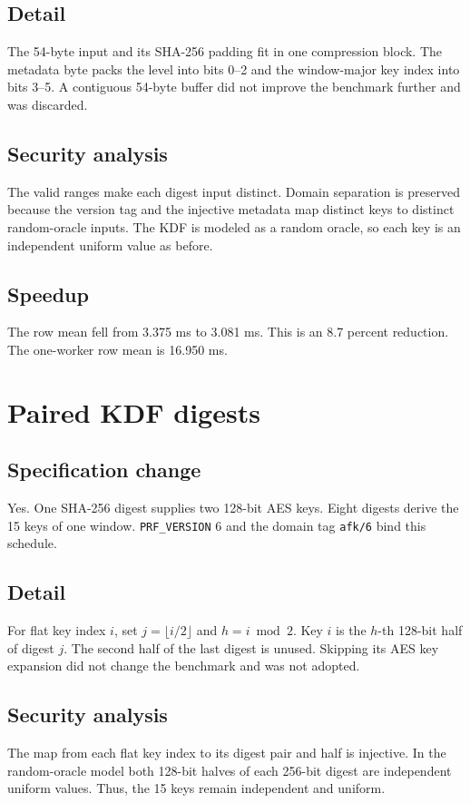 \documentclass[10pt]{article}
\begin{document}
\subsection{Detail}
The 54-byte input and its SHA-256 padding fit in one compression block.
The metadata byte packs the level into bits 0--2 and the window-major key index into bits 3--5.
A contiguous 54-byte buffer did not improve the benchmark further and was discarded.

\subsection{Security analysis}
The valid ranges make each digest input distinct.
Domain separation is preserved because the version tag and the injective metadata map distinct keys to distinct random-oracle inputs.
The KDF is modeled as a random oracle, so each key is an independent uniform value as before.

\subsection{Speedup}
The row mean fell from 3.375 ms to 3.081 ms.
This is an 8.7 percent reduction.
The one-worker row mean is 16.950 ms.

\section{Paired KDF digests}
\label{sec:o11}

\subsection{Specification change}
Yes.
One SHA-256 digest supplies two 128-bit AES keys.
Eight digests derive the 15 keys of one window.
\texttt{PRF\_VERSION} 6 and the domain tag \texttt{afk/6} bind this schedule.

\subsection{Detail}
For flat key index $i$, set $j=\lfloor i/2\rfloor$ and $h=i\bmod2$.
Key $i$ is the $h$-th 128-bit half of digest $j$.
The second half of the last digest is unused.
Skipping its AES key expansion did not change the benchmark and was not adopted.

\subsection{Security analysis}
The map from each flat key index to its digest pair and half is injective.
In the random-oracle model both 128-bit halves of each 256-bit digest are independent uniform values.
Thus, the 15 keys remain independent and uniform.
\end{document}
